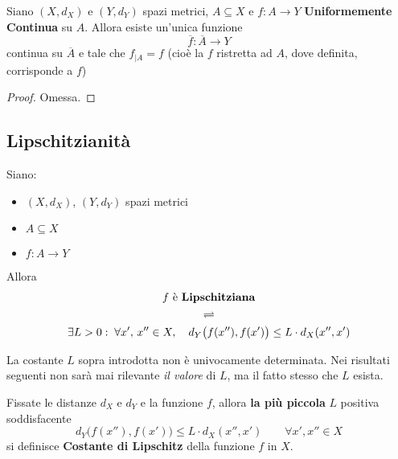 \begin{proposition}
	Siano $(X,d_X)$ e $(Y,d_Y)$ spazi metrici, $A \subseteq X$ e $f:A \to Y$ \textbf{Uniformemente Continua} su $A$. Allora esiste un'unica funzione
	\[\overline{f}: \overline{A} \to Y\]
	continua su $\overline{A}$ e tale che $f_{|A} = f$ (cioè la $f$ ristretta ad $A$, dove definita, corrisponde a $f$)
	\begin{proof}
		Omessa.
	\end{proof}
\end{proposition}

\subsection{Lipschitzianità}
\begin{definition}
	\label{def:lips}
	Siano:
	\begin{itemize}[noitemsep]
		\item $(X,d_X)$, $(Y,d_Y)$ spazi metrici
		\item $A \subseteq X$
		\item $f:A \to Y$
	\end{itemize}
	Allora
	\begin{equation*}
		\begin{gathered}
			f \text{ è \textbf{Lipschitziana}}\\
			\rightleftharpoons\\
			\exists L > 0:\; \forall x',\,x'' \in X, \quad d_Y\bigl(f(x''),f(x')\bigr) \leq L \cdot d_X(x'',x')
		\end{gathered}
	\end{equation*}
	\begin{note}
		La costante $L$ sopra introdotta non è univocamente determinata. Nei risultati seguenti non sarà mai rilevante \textit{il valore} di $L$, ma il fatto stesso che $L$ esista.
	\end{note}
\end{definition}
\begin{definition}
	\label{def:cost_lips}
	Fissate le distanze $d_X$ e $d_Y$ e la funzione $f$, allora \textbf{la più piccola} $L$ positiva soddisfacente
	\[d_Y\bigl(f(x''),f(x')\bigr)\leq L \cdot d_X(x'',x') \qquad \forall x',x'' \in X\]
	si definisce \textbf{Costante di Lipschitz} della funzione $f$ in $X$.
\end{definition}
